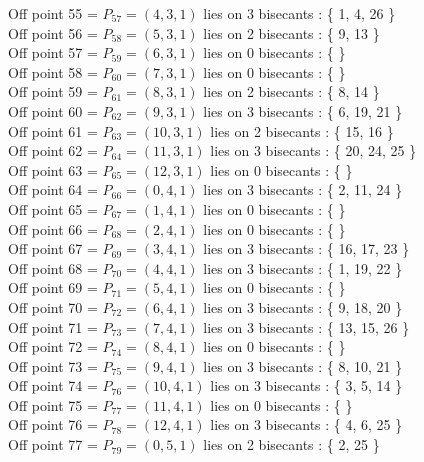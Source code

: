 \documentclass{article}
\begin{document}
{Off point 55 = $P_{57} = ( 4, 3, 1 )$ lies on 3 bisecants : \{ 1, 4, 26 \}\\
Off point 56 = $P_{58} = ( 5, 3, 1 )$ lies on 2 bisecants : \{ 9, 13 \}\\
Off point 57 = $P_{59} = ( 6, 3, 1 )$ lies on 0 bisecants : \{  \}\\
Off point 58 = $P_{60} = ( 7, 3, 1 )$ lies on 0 bisecants : \{  \}\\
Off point 59 = $P_{61} = ( 8, 3, 1 )$ lies on 2 bisecants : \{ 8, 14 \}\\
Off point 60 = $P_{62} = ( 9, 3, 1 )$ lies on 3 bisecants : \{ 6, 19, 21 \}\\
Off point 61 = $P_{63} = ( 10, 3, 1 )$ lies on 2 bisecants : \{ 15, 16 \}\\
Off point 62 = $P_{64} = ( 11, 3, 1 )$ lies on 3 bisecants : \{ 20, 24, 25 \}\\
Off point 63 = $P_{65} = ( 12, 3, 1 )$ lies on 0 bisecants : \{  \}\\
Off point 64 = $P_{66} = ( 0, 4, 1 )$ lies on 3 bisecants : \{ 2, 11, 24 \}\\
Off point 65 = $P_{67} = ( 1, 4, 1 )$ lies on 0 bisecants : \{  \}\\
Off point 66 = $P_{68} = ( 2, 4, 1 )$ lies on 0 bisecants : \{  \}\\
Off point 67 = $P_{69} = ( 3, 4, 1 )$ lies on 3 bisecants : \{ 16, 17, 23 \}\\
Off point 68 = $P_{70} = ( 4, 4, 1 )$ lies on 3 bisecants : \{ 1, 19, 22 \}\\
Off point 69 = $P_{71} = ( 5, 4, 1 )$ lies on 0 bisecants : \{  \}\\
Off point 70 = $P_{72} = ( 6, 4, 1 )$ lies on 3 bisecants : \{ 9, 18, 20 \}\\
Off point 71 = $P_{73} = ( 7, 4, 1 )$ lies on 3 bisecants : \{ 13, 15, 26 \}\\
Off point 72 = $P_{74} = ( 8, 4, 1 )$ lies on 0 bisecants : \{  \}\\
Off point 73 = $P_{75} = ( 9, 4, 1 )$ lies on 3 bisecants : \{ 8, 10, 21 \}\\
Off point 74 = $P_{76} = ( 10, 4, 1 )$ lies on 3 bisecants : \{ 3, 5, 14 \}\\
Off point 75 = $P_{77} = ( 11, 4, 1 )$ lies on 0 bisecants : \{  \}\\
Off point 76 = $P_{78} = ( 12, 4, 1 )$ lies on 3 bisecants : \{ 4, 6, 25 \}\\
Off point 77 = $P_{79} = ( 0, 5, 1 )$ lies on 2 bisecants : \{ 2, 25 \}\\
}
\end{document}
